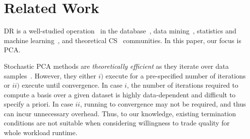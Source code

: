 \section{Related Work}
\label{sec:relwork}
\label{sec:relatedwork}

 DR is a well-studied operation~\cite{dr-survey1,dr-survey2,nonlinear-dr} in the
database~\cite{keogh-indexing,local-dr,charu-ss}, data
mining~\cite{sax,paa}, statistics and machine
learning~\cite{alecton,shamir}, and theoretical CS~\cite{bernstein,pca-stoc} communities.
In this paper, our focus is PCA.

Stochastic PCA methods are \emph{theoretically efficient} as they iterate over data samples~\cite{re-new, shamir}.
However, they either $i)$ execute for a pre-specified number of iterations or $ii)$ execute until convergence.
In case $i$, the number of iterations required to compute a basis over a given dataset is highly data-dependent and difficult to specify a priori.
In case $ii$, running to convergence may not be required, and thus can incur unnecessary overhead.
Thus, to our knowledge, existing termination conditions are not suitable when considering willingness to trade quality for whole workload runtime.






